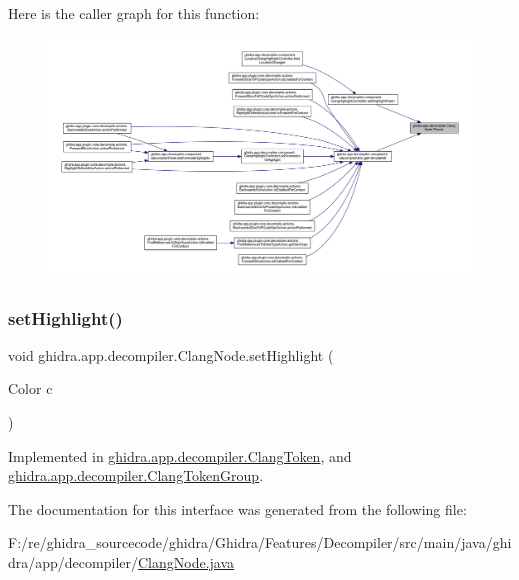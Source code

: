 Here is the caller graph for this function\+:
\nopagebreak
\begin{figure}[H]
\begin{center}
\leavevmode
\includegraphics[width=350pt]{interfaceghidra_1_1app_1_1decompiler_1_1_clang_node_a27b0287e5069850a61b4312f7d2737a4_icgraph}
\end{center}
\end{figure}
\mbox{\label{interfaceghidra_1_1app_1_1decompiler_1_1_clang_node_a4c8a1dc76211ce497441c58554675f55}} 
\subsubsection{\texorpdfstring{setHighlight()}{setHighlight()}}
{\footnotesize\ttfamily void ghidra.\+app.\+decompiler.\+Clang\+Node.\+set\+Highlight (\begin{DoxyParamCaption}\item[{Color}]{c }\end{DoxyParamCaption})}



Implemented in \mbox{\hyperlink{classghidra_1_1app_1_1decompiler_1_1_clang_token_abc4aa5a1ad389a7bc71377aee25048e0}{ghidra.\+app.\+decompiler.\+Clang\+Token}}, and \mbox{\hyperlink{classghidra_1_1app_1_1decompiler_1_1_clang_token_group_a1d6830afbeca1ea9affffb6fae945aff}{ghidra.\+app.\+decompiler.\+Clang\+Token\+Group}}.



The documentation for this interface was generated from the following file\+:\begin{DoxyCompactItemize}
\item 
F\+:/re/ghidra\+\_\+sourcecode/ghidra/\+Ghidra/\+Features/\+Decompiler/src/main/java/ghidra/app/decompiler/\mbox{\hyperlink{_clang_node_8java}{Clang\+Node.\+java}}\end{DoxyCompactItemize}
